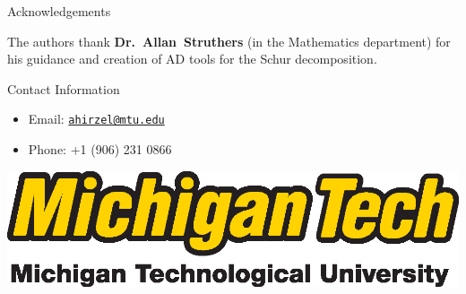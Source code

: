 \documentclass[final]{beamer}
\newlength{\onecolwid}
\begin{document}
\begin{frame}[t]
\begin{columns}[t]
\begin{column}{\onecolwid}
\begin{block}{Acknowledgements}

The authors thank \textbf{Dr.~Allan~Struthers} (in the Mathematics department)
for his guidance and creation of AD tools for the Schur decomposition.

\end{block}



\begin{block}{Contact Information}

\begin{itemize}
\item Email: \href{mailto:ahirzel@mtu.edu}{\texttt{ahirzel@mtu.edu}}
\item Phone: +1 (906) 231 0866
\end{itemize}

\end{block}

\begin{center}
\includegraphics[width=0.5\linewidth]{logo_withfullname_LG.eps}
\end{center}


\end{column} %

\end{columns} %

\end{frame} %
\end{document}
